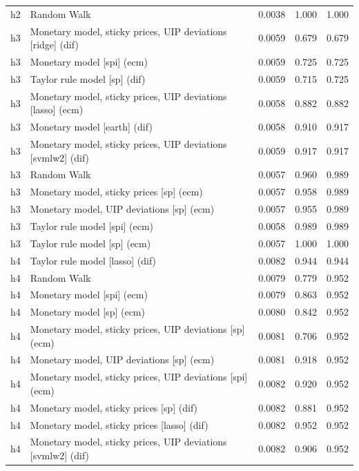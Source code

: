 \begin{ThreePartTable}
\begin{longtable}[t]{cp{5.5cm}ccc}
h2 & \raggedright Random Walk & 0.0038 & 1.000 & 1.000\\
\addlinespace
h3 & \raggedright Monetary model, sticky prices, UIP deviations [ridge] (dif) & 0.0059 & 0.679 & 0.679\\
h3 & \raggedright Monetary model [spi] (ecm) & 0.0059 & 0.725 & 0.725\\
h3 & \raggedright Taylor rule model [sp] (dif) & 0.0059 & 0.715 & 0.725\\
h3 & \raggedright Monetary model, sticky prices, UIP deviations [lasso] (ecm) & 0.0058 & 0.882 & 0.882\\
h3 & \raggedright Monetary model [earth] (dif) & 0.0058 & 0.910 & 0.917\\
h3 & \raggedright Monetary model, sticky prices, UIP deviations [svmlw2] (dif) & 0.0059 & 0.917 & 0.917\\
h3 & \raggedright Random Walk & 0.0057 & 0.960 & 0.989\\
h3 & \raggedright Monetary model, sticky prices [sp] (ecm) & 0.0057 & 0.958 & 0.989\\
h3 & \raggedright Monetary model, UIP deviations [sp] (ecm) & 0.0057 & 0.955 & 0.989\\
h3 & \raggedright Taylor rule model [spi] (ecm) & 0.0058 & 0.989 & 0.989\\
h3 & \raggedright Taylor rule model [sp] (ecm) & 0.0057 & 1.000 & 1.000\\
\addlinespace
h4 & \raggedright Taylor rule model [lasso] (dif) & 0.0082 & 0.944 & 0.944\\
h4 & \raggedright Random Walk & 0.0079 & 0.779 & 0.952\\
h4 & \raggedright Monetary model [spi] (ecm) & 0.0079 & 0.863 & 0.952\\
h4 & \raggedright Monetary model [sp] (ecm) & 0.0080 & 0.842 & 0.952\\
h4 & \raggedright Monetary model, sticky prices, UIP deviations [sp] (ecm) & 0.0081 & 0.706 & 0.952\\
h4 & \raggedright Monetary model, UIP deviations [sp] (ecm) & 0.0081 & 0.918 & 0.952\\
h4 & \raggedright Monetary model, sticky prices, UIP deviations [spi] (ecm) & 0.0082 & 0.920 & 0.952\\
h4 & \raggedright Monetary model, sticky prices [sp] (dif) & 0.0082 & 0.881 & 0.952\\
h4 & \raggedright Monetary model, sticky prices [lasso] (dif) & 0.0082 & 0.952 & 0.952\\
h4 & \raggedright Monetary model, sticky prices, UIP deviations [svmlw2] (dif) & 0.0082 & 0.906 & 0.952\\

\end{longtable}
\end{ThreePartTable}
